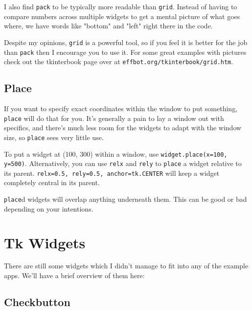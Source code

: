 \documentclass[a4paper,11pt,openany]{book}
\begin{document}
I also find \lstinline[columns=fixed]{pack} to be typically more readable than \lstinline[columns=fixed]{grid}. Instead of having to compare numbers across multiple widgets to get a mental picture of what goes where, we have words like "bottom" and "left" right there in the code. 

\vspace{5mm}

Despite my opinions, \lstinline[columns=fixed]{grid} is a powerful tool, so if you feel it is better for the job than \lstinline[columns=fixed]{pack} then I encourage you to use it. For some great examples with pictures check out the tkinterbook page over at \lstinline[columns=fixed]{effbot.org/tkinterbook/grid.htm}. 

\subsection{Place}

If you want to specify exact coordinates within the window to put something, \lstinline[columns=fixed]{place} will do that for you. It's generally a pain to lay a window out with specifics, and there's much less room for the widgets to adapt with the window size, so \lstinline[columns=fixed]{place} sees very little use. 

\vspace{5mm}

To put a widget at (100, 300) within a window, use \lstinline[columns=fixed]{widget.place(x=100, y=500)}. Alternatively, you can use \lstinline[columns=fixed]{relx} and \lstinline[columns=fixed]{rely} to \lstinline[columns=fixed]{place} a widget relative to its parent. \lstinline[columns=fixed]{relx=0.5, rely=0.5, anchor=tk.CENTER} will keep a widget completely central in its parent. 

\vspace{5mm}

\lstinline[columns=fixed]{place}d widgets will overlap anything underneath them. This can be good or bad depending on your intentions.

\section{Tk Widgets}

There are still some widgets which I didn't manage to fit into any of the example apps. We'll have a brief overview of them here:

\subsection{Checkbutton}
\end{document}
